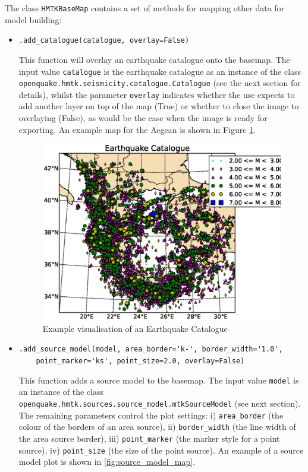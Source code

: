 The class \verb=HMTKBaseMap= contains a set of methods for mapping other data for model building:
\begin{itemize}
\item \verb;.add_catalogue(catalogue, overlay=False);

This function will overlay an earthquake catalogue onto the basemap. The input value \verb=catalogue= is the earthquake catalogue as an instance of the class \\\verb=openquake.hmtk.seismicity.catalogue.Catalogue= (see the next section for details), whilst the parameter \verb=overlay= indicates whether the use expects to add another layer on top of the map (True) or whether to close the image to overlaying (False), as would be the case when the image is ready for exporting. An example map for the Aegean is shown in Figure \ref{fig:eqcat_simple}.
   
\begin{figure}[htb]
  \centering
      \includegraphics[trim=20mm 14mm 1mm 1mm, clip, width=\textwidth]{./figures/EQCatalogueSimple.eps}
  \caption{Example visualisation of an Earthquake Catalogue}
  \label{fig:eqcat_simple}
\end{figure}

\item \verb;.add_source_model(model, area_border='k-', border_width='1.0',;\\
    \verb;    point_marker='ks', point_size=2.0, overlay=False);

This function adds a source model to the basemap. The input value \verb=model= is an instance of the class \verb=openquake.hmtk.sources.source_model.mtkSourceModel= (see next section). The remaining parameters control the plot settings: i) \verb=area_border= (the colour of the borders of an area source), ii) \verb=border_width= (the line width of the area source border), iii) \verb=point_marker= (the marker style for a point source), iv) \verb=point_size= (the size of the point source). An example of a source model plot is shown in \ref{fig:source_model_map}.
 

\end{itemize}
